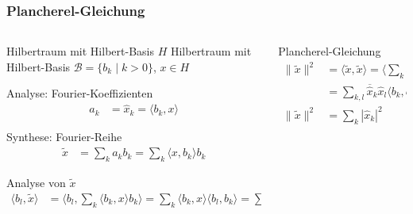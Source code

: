 %
%
%
\bgroup
\begin{frame}[t]
\setlength{\abovedisplayskip}{5pt}
\setlength{\belowdisplayskip}{5pt}
\frametitle{Plancherel-Gleichung}
\vspace{-20pt}
\begin{columns}[t,onlytextwidth]
\begin{column}{0.48\textwidth}
\begin{block}{Hilbertraum mit Hilbert-Basis}
$H$ Hilbertraum mit Hilbert-Basis
$\mathcal{B}=\{b_k\;|\; k>0\}$, $x\in H$
\end{block}
\begin{block}{Analyse: Fourier-Koeffizienten}
\begin{align*}
a_k &= \hat{x}_k=\langle b_k, x\rangle
\end{align*}
\end{block}
\begin{block}{Synthese: Fourier-Reihe}
\begin{align*}
\tilde{x}
&=
\sum_k a_k b_k
=
\sum_k \langle x,b_k\rangle b_k
\end{align*}
\end{block}
\begin{block}{Analyse von $\tilde{x}$}
\begin{align*}
\langle b_l,\tilde{x}\rangle
&=
\biggl\langle
b_l,\sum_{k}\langle b_k,x\rangle b_k
\biggr\rangle
=
\sum_k \langle b_k,x\rangle\langle b_l,b_k\rangle
=
\sum_k \langle b_k,x\rangle\delta_{kl}
=
\langle b_l,x\rangle
=
\hat{x}_l
\end{align*}
\end{block}
\end{column}
\begin{column}{0.48\textwidth}
\begin{block}{Plancherel-Gleichung}
\begin{align*}
\|\tilde{x}\|^2
&=
\langle \tilde{x},\tilde{x}\rangle
=
\biggl\langle
\sum_k \hat{x}_kb_k,
\sum_l \hat{x}_lb_l
\biggr\rangle
\\
&=
\sum_{k,l} \overline{\hat{x}}_k\hat{x}_l\langle b_k,b_l\rangle
=
\sum_{k,l} \overline{\hat{x}}_k\hat{x}_l\delta_{kl}
\\
\|\tilde{x}\|^2
&=
\sum_k |\hat{x}_k|^2
\end{align*}
\end{block}
\end{column}
\end{columns}
\end{frame}
\egroup
